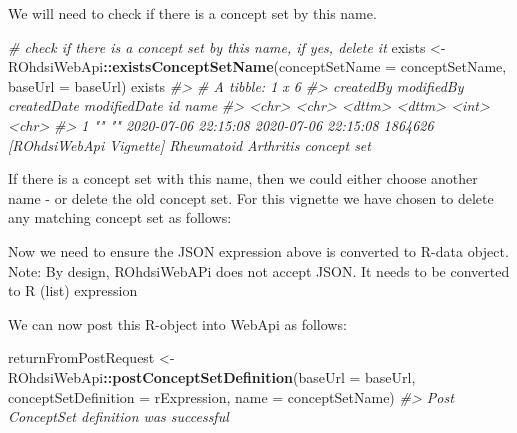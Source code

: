 \documentclass[
]{article}
\newenvironment{Shaded}{\begin{snugshade}}{\end{snugshade}}
\newcommand{\CommentTok}[1]{\textcolor[rgb]{0.56,0.35,0.01}{\textit{#1}}}
\newcommand{\ControlFlowTok}[1]{\textcolor[rgb]{0.13,0.29,0.53}{\textbf{#1}}}
\newcommand{\DataTypeTok}[1]{\textcolor[rgb]{0.13,0.29,0.53}{#1}}
\newcommand{\KeywordTok}[1]{\textcolor[rgb]{0.13,0.29,0.53}{\textbf{#1}}}
\newcommand{\NormalTok}[1]{#1}
\newcommand{\OperatorTok}[1]{\textcolor[rgb]{0.81,0.36,0.00}{\textbf{#1}}}
\newcommand{\StringTok}[1]{\textcolor[rgb]{0.31,0.60,0.02}{#1}}
\begin{document}
We will need to check if there is a concept set by this name.

\begin{Shaded}
\begin{Highlighting}[]
\CommentTok{\# check if there is a concept set by this name, if yes, delete it}
\NormalTok{exists <{-}}\StringTok{ }\NormalTok{ROhdsiWebApi}\OperatorTok{::}\KeywordTok{existsConceptSetName}\NormalTok{(}\DataTypeTok{conceptSetName =}\NormalTok{ conceptSetName, }\DataTypeTok{baseUrl =}\NormalTok{ baseUrl)}
\NormalTok{exists}
\CommentTok{\#> \# A tibble: 1 x 6}
\CommentTok{\#>   createdBy modifiedBy createdDate         modifiedDate             id name                                                    }
\CommentTok{\#>   <chr>     <chr>      <dttm>              <dttm>                <int> <chr>                                                   }
\CommentTok{\#> 1 ""        ""         2020{-}07{-}06 22:15:08 2020{-}07{-}06 22:15:08 1864626 [ROhdsiWebApi Vignette] Rheumatoid Arthritis concept set}
\end{Highlighting}
\end{Shaded}

If there is a concept set with this name, then we could either choose
another name - or delete the old concept set. For this vignette we have
chosen to delete any matching concept set as follows:

\begin{Shaded}
\end{Shaded}

Now we need to ensure the JSON expression above is converted to R-data
object. Note: By design, ROhdsiWebAPi does not accept JSON. It needs to
be converted to R (list) expression

We can now post this R-object into WebApi as follows:

\begin{Shaded}
\begin{Highlighting}[]
\NormalTok{returnFromPostRequest <{-}}\StringTok{ }\NormalTok{ROhdsiWebApi}\OperatorTok{::}\KeywordTok{postConceptSetDefinition}\NormalTok{(}\DataTypeTok{baseUrl =}\NormalTok{ baseUrl, }
                                                                \DataTypeTok{conceptSetDefinition =}\NormalTok{ rExpression, }
                                                                \DataTypeTok{name =}\NormalTok{ conceptSetName)}
\CommentTok{\#> Post ConceptSet definition was successful}
\end{Highlighting}
\end{Shaded}
\end{document}
